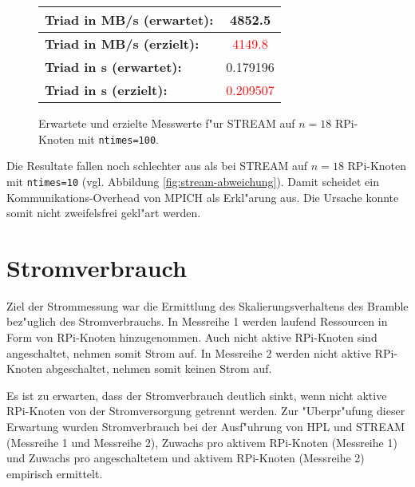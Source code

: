 \begin{enumerate}
\begin{figure}[H]
\begin{tabular}{|l|c|}
    \hline 
    \textbf{Triad in MB/s (erwartet):} & 4852.5\\
    \hline 
    \textbf{Triad in MB/s (erzielt):} & \textcolor{red}{4149.8}\\
    \hline 
    \textbf{Triad in s (erwartet):} & 0.179196\\
    \hline 
    \textbf{Triad in s (erzielt):} & \textcolor{red}{0.209507}\\
    \hline 
  \end{tabular}
  \caption{Erwartete und erzielte Messwerte f"ur STREAM auf $n=18$ RPi-Knoten mit \texttt{ntimes=100}.}\label{fig:stream-ntimes100}
\end{figure}
\noindent
Die Resultate fallen noch schlechter aus als bei STREAM auf $n=18$ RPi-Knoten mit \texttt{ntimes=10} (vgl. Abbildung \ref{fig:stream-abweichung}). Damit scheidet ein Kommunikations-Overhead von MPICH als Erkl"arung aus. Die Ursache konnte somit nicht zweifelsfrei gekl"art werden. 
\end{enumerate}

\section{Stromverbrauch}
Ziel der Strommessung war die Ermittlung des Skalierungsverhaltens des Bramble bez"uglich des Stromverbrauchs. In Messreihe 1 werden laufend Ressourcen in Form von RPi-Knoten hinzugenommen. Auch nicht aktive RPi-Knoten sind angeschaltet, nehmen somit Strom auf. In Messreihe 2 werden nicht aktive RPi-Knoten abgeschaltet, nehmen somit keinen Strom auf. 

Es ist zu erwarten, dass der Stromverbrauch deutlich sinkt, wenn nicht aktive RPi-Knoten von der Stromversorgung getrennt werden. Zur "Uberpr"ufung dieser Erwartung wurden Stromverbrauch bei der Ausf"uhrung von HPL und STREAM (Messreihe 1 und Messreihe 2), Zuwachs pro aktivem RPi-Knoten (Messreihe 1) und Zuwachs pro angeschaltetem und aktivem RPi-Knoten (Messreihe 2) empirisch ermittelt. 

